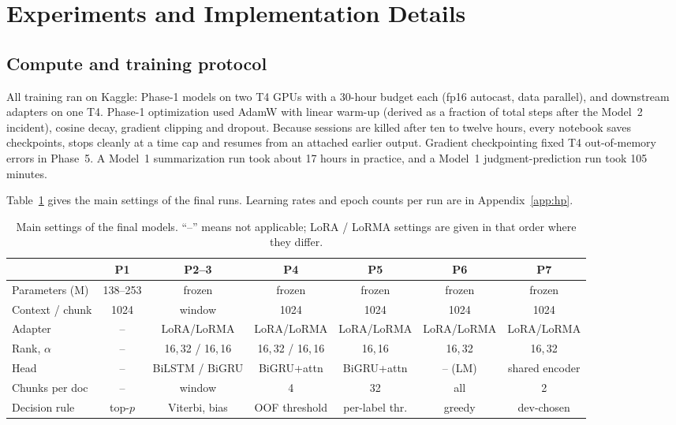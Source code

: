 \documentclass[11pt, oneside]{article}
\begin{document}
\section{Experiments and Implementation Details}
\subsection{Compute and training protocol}
All training ran on Kaggle: Phase-1 models on two T4 GPUs with a 30-hour budget each (fp16 autocast, data parallel), and downstream adapters on one T4. Phase-1 optimization used AdamW \cite{loshchilov2019adamw} with linear warm-up (derived as a fraction of total steps after the Model~2 incident), cosine decay, gradient clipping and dropout. Because sessions are killed after ten to twelve hours, every notebook saves checkpoints, stops cleanly at a time cap and resumes from an attached earlier output. Gradient checkpointing fixed T4 out-of-memory errors in Phase~5. A Model~1 summarization run took about 17 hours in practice, and a Model~1 judgment-prediction run took 105 minutes.

Table~\ref{tab:hparams} gives the main settings of the final runs. Learning rates and epoch counts per run are in Appendix~\ref{app:hp}.
\begin{table}[H]
\centering
\caption{Main settings of the final models. ``--'' means not applicable; LoRA / LoRMA settings are given in that order where they differ.}
\label{tab:hparams}
\scriptsize
\begin{tabular}{lcccccc}
\toprule
 & P1 & P2--3 & P4 & P5 & P6 & P7 \\
\midrule
Parameters (M) & 138--253 & frozen & frozen & frozen & frozen & frozen \\
Context / chunk & 1024 & window & 1024 & 1024 & 1024 & 1024 \\
Adapter & -- & LoRA/LoRMA & LoRA/LoRMA & LoRA/LoRMA & LoRA/LoRMA & LoRA/LoRMA \\
Rank, $\alpha$ & -- & 16,\,32 / 16,\,16 & 16,\,32 / 16,\,16 & 16,\,16 & 16,\,32 & 16,\,32 \\
Head & -- & BiLSTM / BiGRU & BiGRU+attn & BiGRU+attn & -- (LM) & shared encoder \\
Chunks per doc & -- & window & 4 & 32 & all & 2 \\
Decision rule & top-$p$ & Viterbi, bias & OOF threshold & per-label thr. & greedy & dev-chosen \\
\bottomrule
\end{tabular}
\end{table}
\end{document}
